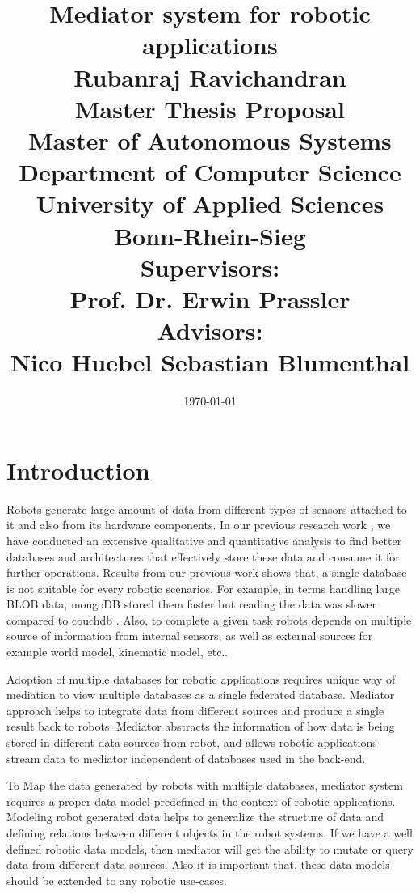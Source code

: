 \documentclass[12pt]{article}
\begin{document}
\title{\Large Mediator system for robotic applications\\
[6mm]
\Large Rubanraj Ravichandran\\
[12mm]
\Large Master Thesis Proposal\\
\small Master of Autonomous Systems\\
[12mm]
\Large Department of Computer Science\\
University of Applied Sciences Bonn-Rhein-Sieg\\
[12mm]
\Large Supervisors:\\
Prof. Dr. Erwin Prassler\\
\Large Advisors:\\
Nico Huebel
Sebastian Blumenthal
}
\date{\today}
\maketitle
\newpage
\section{Introduction}

Robots generate large amount of data from different types of sensors attached to it and also from its hardware components. In our previous research work \cite{ravichandranworkbench}, we have conducted an extensive qualitative and quantitative analysis to find better databases and architectures that effectively store these data and consume it for further operations. Results from our previous work shows that, a single database is not suitable for every robotic scenarios. For example, in terms handling large BLOB data, mongoDB stored them faster but reading the data was slower compared to couchdb \cite{ravichandranworkbench}. Also, to complete a given task robots depends on multiple source of information from internal sensors, as well as external sources for example world model, kinematic model, etc.. 

Adoption of multiple databases for robotic applications requires unique way of mediation to view multiple databases as a single federated database. Mediator approach helps to integrate data from different sources and produce a single result back to robots. Mediator abstracts the information of how data is being stored in different data sources from robot, and allows robotic applications stream data to mediator independent of databases used in the back-end.

To Map the data generated by robots with multiple databases, mediator system requires a proper data model predefined in the context of robotic applications. Modeling robot generated data helps to generalize the structure of data and defining relations between different objects in the robot systems. If we have a well defined robotic data models, then mediator will get the ability to mutate or query data from different data sources. Also it is important that, these data models should be extended to any robotic use-cases.
\end{document}
